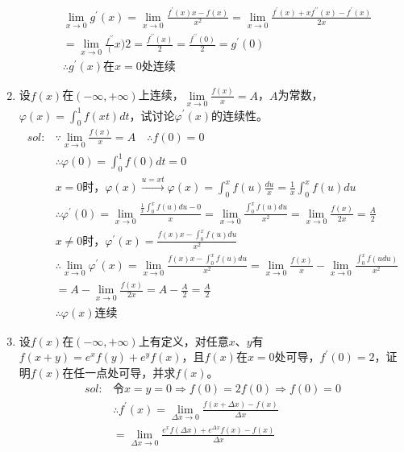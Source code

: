 \begin{enumerate}[{例}1.]
\begin{align*}
                    &\lim_{x\to 0}g^{\prime}(x)=\lim_{x\to 0}\frac{f^{\prime}(x)x-f(x)}{x^2}=\lim_{x\to 0}\frac{f^{\prime}(x)+xf^{\prime\prime}(x)-f^{\prime}(x)}{2x}\\
                    &=\lim_{x\to 0}\frac{f^{\prime\prime}}(x){2}=\frac{f^{\prime\prime}(x)}{2}=\frac{f^{\prime\prime}(0)}{2}=g^{\prime}(0)\\
                    &\therefore g^{\prime}(x)\mbox{在}x=0\mbox{处连续}
            \end{align*}
    \item 设$f(x)$在$(-\infty,+\infty)$上连续，$\lim\limits_{x \to 0}\frac{f(x)}{x}=A$，$A$为常数，$\varphi(x)=\int_0^1 f(xt)dt$，试讨论$\varphi^{\prime}(x)$的连续性。
        \begin{align*}
            sol:&\because\lim_{x\to 0}\frac{f(x)}{x}=A\quad\therefore f(0)=0\\
                &\therefore\varphi(0)=\int_0^1f(0)dt=0\\
                &x=0\mbox{时，}\varphi(x)\xrightarrow{u=xt}\varphi(x)=\int_0^xf(u)\frac{du}{x}=\frac{1}{x}\int_0^xf(u)du\\
                &\therefore\varphi^{\prime}(0)=\lim_{x\to 0}\frac{\frac{1}{x}\int_0^xf(u)du-0}{x}=\lim_{x\to 0}\frac{\int_0^xf(u)du}{x^2}=\lim_{x\to 0}\frac{f(x)}{2x}=\frac{A}{2}\\
                &x\neq 0\mbox{时，}\varphi^{\prime}(x)=\frac{f(x)x-\int_0^xf(u)du}{x^2}\\
                &\therefore\lim_{x\to 0}\varphi^{\prime}(x)=\lim_{x\to 0}\frac{f(x)x-\int_0^xf(u)du}{x^2}=\lim_{x\to 0}\frac{f(x)}{x}-\lim_{x\to 0}\frac{\int_0^xf(udu)}{x^2}\\
                &=A-\lim_{x\to 0}\frac{f(x)}{2x}=A-\frac{A}{2}=\frac{A}{2}\\
                &\therefore\varphi(x)\mbox{连续}
        \end{align*}
    \item 设$f(x)$在$(-\infty,+\infty)$上有定义，对任意$x$、$y$有$f(x+y)=e^xf(y)+e^yf(x)$，且$f(x)$在$x=0$处可导，$f^{\prime}(0)=2$，证明$f(x)$在任一点处可导，并求$f(x)$。
        \begin{align*}
            sol:&\mbox{令}x=y=0\Rightarrow f(0)=2f(0)\Rightarrow f(0)=0\\
                &\therefore f^{\prime}(x)=\lim_{\Delta x\to 0}\frac{f(x+\Delta x)-f(x)}{\Delta x}\\
                &=\lim_{\Delta x\to 0}\frac{e^xf(\Delta x)+e^{\Delta x}f(x)-f(x)}{\Delta x}\\

\end{align*}
\end{enumerate}

